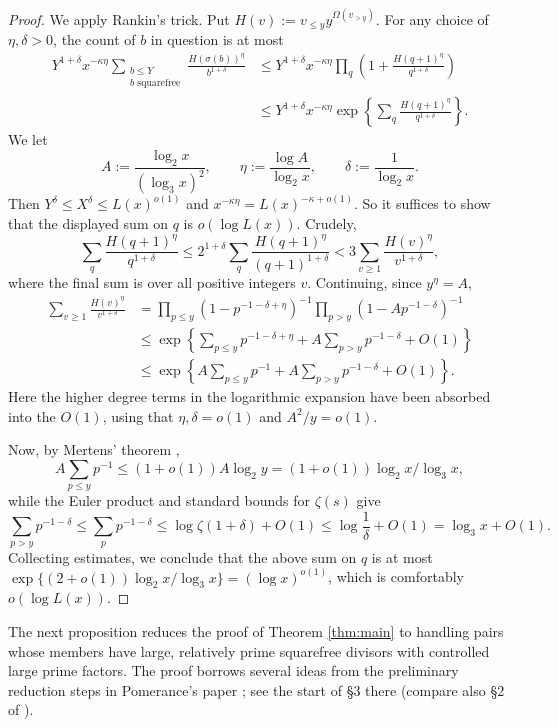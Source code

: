 \documentclass[11pt]{amsart}
\begin{document}
\begin{proof}
We apply Rankin's trick. Put $H(v):=v_{\le y}y^{\Omega(v_{>y})}$. For any choice of $\eta,\delta>0$, the count of $b$ in question is at most
\begin{align*}
 Y^{1+\delta}x^{-\kappa\eta}
 \sum_{\substack{b\le Y\\b\text{ squarefree}}}
 \frac{H(\sigma(b))^\eta}{b^{1+\delta}}
 &\le Y^{1+\delta}x^{-\kappa\eta}
 \prod_q\left(1+\frac{H(q+1)^\eta}{q^{1+\delta}}\right)\\
 &\le Y^{1+\delta}x^{-\kappa\eta}
 \exp\left\{\sum_q\frac{H(q+1)^\eta}{q^{1+\delta}}\right\}.
\end{align*}
We let
\[
 A:=\frac{\log_2 x}{(\log_3 x)^2},\qquad
 \eta:=\frac{\log A}{\log_2 x},\qquad
 \delta:=\frac1{\log_2 x}.
\]
Then $Y^{\delta}\le X^{\delta}\le L(x)^{o(1)}$ and $x^{-\kappa\eta}=L(x)^{-\kappa+o(1)}$. So it suffices to show that the displayed sum on $q$ is $o(\log L(x))$. Crudely,
\[
 \sum_q\frac{H(q+1)^\eta}{q^{1+\delta}}
 \le 2^{1+\delta}\sum_q\frac{H(q+1)^\eta}{(q+1)^{1+\delta}}
 <3\sum_{v\ge1}\frac{H(v)^\eta}{v^{1+\delta}},
\]
where the final sum is over all positive integers $v$. Continuing, since $y^\eta=A$,
\begin{align*}
 \sum_{v\ge1}\frac{H(v)^\eta}{v^{1+\delta}}
 &=\prod_{p\le y}(1-p^{-1-\delta+\eta})^{-1}
   \prod_{p>y}(1-Ap^{-1-\delta})^{-1}\\
 &\le\exp\left\{\sum_{p\le y}p^{-1-\delta+\eta}
       +A\sum_{p>y}p^{-1-\delta}+O(1)\right\}\\
 &\le\exp\left\{A\sum_{p\le y}p^{-1}
       +A\sum_{p>y}p^{-1-\delta}+O(1)\right\}.
\end{align*}
Here the higher degree terms in the logarithmic expansion have been absorbed into the $O(1)$, using that $\eta,\delta=o(1)$ and $A^2/y=o(1)$.

Now, by Mertens' theorem \cite[Theorem 2.7(d), p.~50]{MontgomeryVaughan2007},
\[
 A\sum_{p\le y}p^{-1}\le(1+o(1))A\log_2 y
 =(1+o(1))\log_2 x/\log_3 x,
\]
while the Euler product and standard bounds for $\zeta(s)$ \cite[Corollaries 1.11 and 1.14, pp.~23, 25]{MontgomeryVaughan2007} give
\[
 \sum_{p>y}p^{-1-\delta}\le\sum_p p^{-1-\delta}
 \le\log\zeta(1+\delta)+O(1)
 \le\log\frac1\delta+O(1)=\log_3 x+O(1).
\]
Collecting estimates, we conclude that the above sum on $q$ is at most $\exp\{(2+o(1))\log_2 x/\log_3 x\}\allowbreak=(\log x)^{o(1)}$, which is comfortably $o(\log L(x))$.
\end{proof}

    The next proposition reduces the proof of Theorem \ref{thm:main} to handling pairs whose members have large, relatively prime squarefree divisors with controlled large prime factors. 
    The proof borrows several ideas from the preliminary reduction steps in Pomerance's paper \cite{Pomerance2015}; see the start of \S3 there (compare also \S2 of \cite{Pomerance1981}). 
\end{document}
